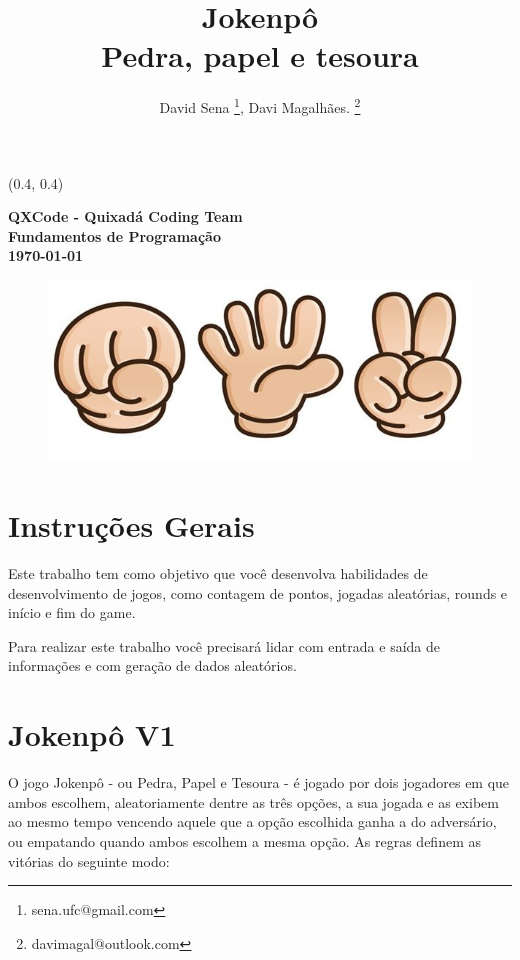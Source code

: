 \documentclass[12pt]{article}
\renewcommand{\bf}[1]{\textbf{#1}}
\begin{document}

\begin{textblock}{15}(0.4, 0.4)
\noindent
\begin{center}
\LARGE{\bf{QXCode - Quixadá Coding Team}}\\
\large{\bf{Fundamentos de Programação}} \\
\large{\bf{\today}}
\end{center}
\end{textblock}

\title{\bf{Jokenpô\\Pedra, papel e tesoura}}

\author{
David Sena \thanks{sena.ufc@gmail.com}, 
Davi Magalhães. \thanks{davimagal@outlook.com}
}

\date{}

\maketitle
\thispagestyle{empty}


\begin{figure}[h!]
\centering
\includegraphics[width=0.4\linewidth]{imagens/pedra-papel-tesoura}
\label{fig:jogo}
\end{figure}

\section{Instruções Gerais}
Este trabalho tem como objetivo que você desenvolva habilidades de desenvolvimento de jogos, como contagem de pontos, jogadas aleatórias, rounds e início e fim do game.

Para realizar este trabalho você precisará lidar com entrada e saída de informações e com geração de dados aleatórios.

\section{Jokenpô V1}
O jogo Jokenpô - ou Pedra, Papel e Tesoura - é jogado por dois jogadores em que ambos escolhem, aleatoriamente dentre as três opções, a sua jogada e as exibem ao mesmo tempo vencendo aquele que a opção escolhida ganha a do adversário, ou empatando quando ambos escolhem a mesma opção.
As regras definem as vitórias do seguinte modo:
\end{document}
